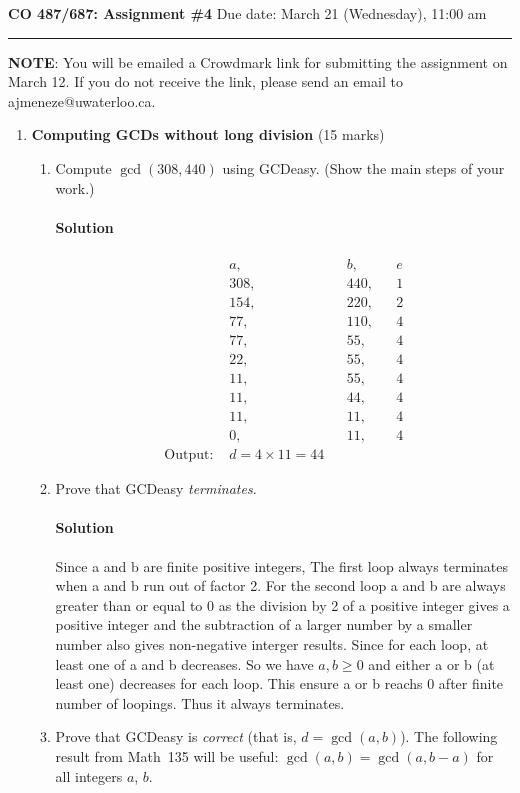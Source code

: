 \documentclass[11pt]{article}
\begin{document}
\noindent
{\large\bf CO 487/687: Assignment \#4} \hfill Due date: March 21 (Wednesday),
11:00 am

\hfill\hrule

\vspace*{2mm}
\noindent
{\bf NOTE}: You will be emailed a Crowdmark link for submitting the
assignment on March 12. If you do not receive the link, please
send an email to ajmeneze@uwaterloo.ca.

\begin{enumerate}

\item {\bf Computing GCDs without long division} (15 marks) \\
\begin{enumerate}
\item Compute $\gcd(308,440)$ using GCDeasy. (Show the main steps of your
work.)

\paragraph{Solution}
\begin{align*}
&a,&&b,&&e\\
&308,&&440,&&1\\
&154,&&220,&&2\\
&77,&&110,&&4\\
&77,&&55,&&4\\
&22,&&55,&&4\\
&11,&&55,&&4\\
&11,&&44,&&4\\
&11,&&11,&&4\\
&0,&&11,&&4\\
\text{Output: } & d = 4\times 11 = 44
\end{align*}
\item Prove that GCDeasy \emph{terminates}.
\paragraph{Solution}
Since a and b are finite positive integers, The first loop always terminates when a and b run out of factor 2.
For the second loop a and b are always greater than or equal to 0 as the division by 2 of a positive integer gives a positive integer and the subtraction of a larger number by a smaller number also gives non-negative interger results. Since for each loop, at least one of a and b decreases. So we have $a,b\geq 0$ and either a or b (at least one) decreases for each loop. This ensure a or b reachs 0 after finite number of loopings. Thus it always terminates.
\item Prove that GCDeasy is \emph{correct} (that is, $d=\gcd(a,b)$). The
      following result from Math~135 will be useful:
      $\gcd(a,b)=\gcd(a,b-a)$ for all integers $a$, $b$.

\end{enumerate}
\end{enumerate}
\end{document}
